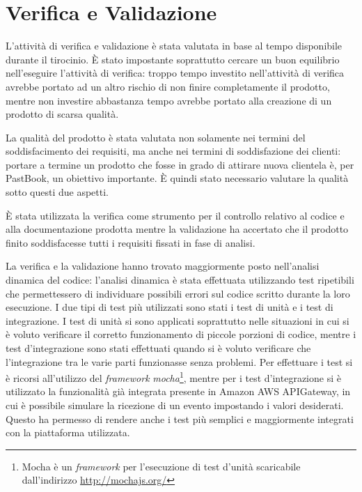 
\chapter{Verifica e Validazione}

L'attività di verifica e validazione è stata valutata in base al tempo
disponibile durante il tirocinio. È stato impostante soprattutto cercare un
buon equilibrio nell'eseguire l'attività di verifica: troppo tempo investito
nell'attività di verifica avrebbe portato ad un altro rischio di non finire
completamente il prodotto, mentre non investire abbastanza tempo avrebbe
portato alla creazione di un prodotto di scarsa qualità.

La qualità del prodotto è stata valutata non solamente nei termini del
soddisfacimento dei requisiti, ma anche nei termini di soddisfazione dei
clienti: portare a termine un prodotto che fosse in grado di attirare nuova
clientela è, per PastBook, un obiettivo importante. È quindi stato necessario
valutare la qualità sotto questi due aspetti.

È stata utilizzata la verifica come strumento per il controllo relativo
al codice e alla documentazione prodotta mentre la validazione ha accertato
che il prodotto finito soddisfacesse tutti i requisiti fissati in fase di
analisi.

La verifica e la validazione hanno trovato maggiormente posto nell'analisi
dinamica del codice: l'analisi dinamica è stata effettuata utilizzando test
ripetibili che permettessero di individuare possibili errori sul codice
scritto durante la loro esecuzione.
I due tipi di test più utilizzati sono stati i test di unità e i test di
integrazione.
I test di unità si sono applicati soprattutto nelle situazioni in cui si è
voluto verificare il corretto funzionamento di piccole porzioni di codice,
mentre i test d'integrazione sono stati effettuati quando si è voluto
verificare che l'integrazione tra le varie parti funzionasse senza problemi.
Per effettuare i test si è ricorsi all'utilizzo del \textit{framework}
\textit{mocha}\footnote{Mocha è un \textit{framework} per l'esecuzione di test
d'unità scaricabile dall'indirizzo \url{http://mochajs.org/}}, mentre per i
test d'integrazione si è utilizzato la funzionalità già integrata presente in
Amazon AWS APIGateway, in cui è possibile simulare la ricezione di un evento
impostando i valori desiderati. Questo ha permesso di rendere anche i test più
semplici e maggiormente integrati con la piattaforma utilizzata.
